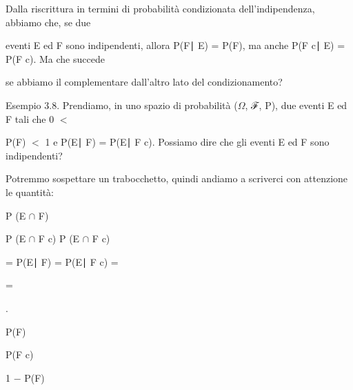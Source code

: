 \documentclass[a4paper,portrait,12pt]{article}
\begin{document}
\begin{flushleft}
Dalla riscrittura in termini di probabilit\`{a} condizionata dell'indipendenza, abbiamo che, se due
\end{flushleft}


\begin{flushleft}
eventi E ed F sono indipendenti, allora P(F∣ E) = P(F), ma anche P(F c∣ E) = P(F c). Ma che succede
\end{flushleft}


\begin{flushleft}
se abbiamo il complementare dall'altro lato del condizionamento?
\end{flushleft}


\begin{flushleft}
Esempio 3.8. Prendiamo, in uno spazio di probabilit\`{a} ($\Omega$, ℱ, P), due eventi E ed F tali che 0 $<$
\end{flushleft}


\begin{flushleft}
P(F) $<$ 1 e P(E∣ F) = P(E∣ F c). Possiamo dire che gli eventi E ed F sono indipendenti?
\end{flushleft}


\begin{flushleft}
Potremmo sospettare un trabocchetto, quindi andiamo a scriverci con attenzione le quantit\`{a}:
\end{flushleft}


\begin{flushleft}
P (E $\cap$ F)
\end{flushleft}


\begin{flushleft}
P (E $\cap$ F c) P (E $\cap$ F c)
\end{flushleft}


\begin{flushleft}
= P(E∣ F) = P(E∣ F c) =
\end{flushleft}


=


.


\begin{flushleft}
P(F)
\end{flushleft}


\begin{flushleft}
P(F c)
\end{flushleft}


\begin{flushleft}
1 $-$ P(F)
\end{flushleft}
\end{document}

